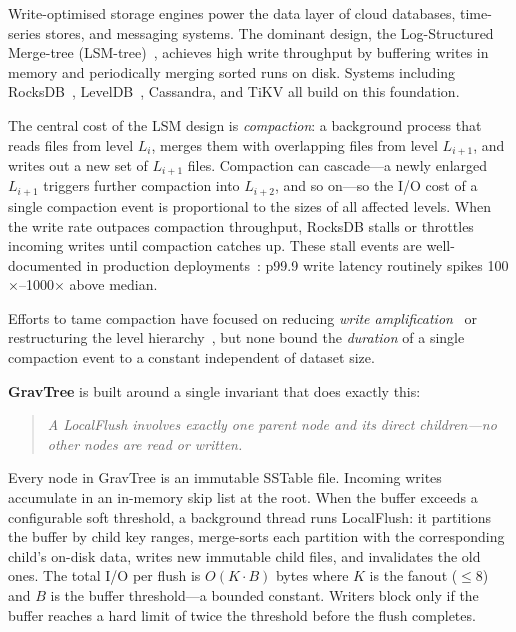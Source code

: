 \documentclass[10pt,twocolumn]{article}
\begin{document}
Write-optimised storage engines power the data layer of cloud databases,
time-series stores, and messaging systems.  The dominant design,
the Log-Structured Merge-tree (LSM-tree)~\cite{oneil1996lsm}, achieves high
write throughput by buffering writes in memory and periodically merging
sorted runs on disk.  Systems including RocksDB~\cite{rocksdb},
LevelDB~\cite{leveldb}, Cassandra, and TiKV all build on this foundation.

The central cost of the LSM design is \emph{compaction}: a background process
that reads files from level $L_i$, merges them with overlapping files from
level $L_{i+1}$, and writes out a new set of $L_{i+1}$ files.  Compaction
can cascade---a newly enlarged $L_{i+1}$ triggers further compaction into
$L_{i+2}$, and so on---so the I/O cost of a single compaction event is
proportional to the sizes of all affected levels.  When the write rate
outpaces compaction throughput, RocksDB stalls or throttles incoming writes
until compaction catches up.  These stall events are well-documented in
production deployments~\cite{lsm-survey,dostoevsky}: p99.9 write latency
routinely spikes 100$\times$--1000$\times$ above median.

Efforts to tame compaction have focused on reducing \emph{write
amplification}~\cite{wisckey,pebblesdb,dostoevsky,monkey} or restructuring
the level hierarchy~\cite{pebblesdb}, but none bound the \emph{duration} of
a single compaction event to a constant independent of dataset size.

\textbf{GravTree} is built around a single invariant that does exactly this:

\begin{quote}
\textit{A LocalFlush involves exactly one parent node and its direct
children---no other nodes are read or written.}
\end{quote}

Every node in GravTree is an immutable SSTable file.  Incoming writes
accumulate in an in-memory skip list at the root.  When the buffer exceeds a
configurable soft threshold, a background thread runs LocalFlush: it
partitions the buffer by child key ranges, merge-sorts each partition with the
corresponding child's on-disk data, writes new immutable child files, and
invalidates the old ones.  The total I/O per flush is $O(K \cdot B)$ bytes
where $K$ is the fanout ($\leq 8$) and $B$ is the buffer threshold---a bounded
constant.  Writers block only if the buffer reaches a hard limit of twice
the threshold before the flush completes.
\end{document}

